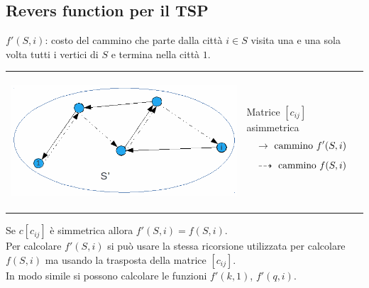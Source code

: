\subsection{Revers function per il TSP}
$f'(S,i)$: costo del cammino che parte dalla città $i\in S$ visita una e una sola volta tutti i vertici di $S$ e termina nella città $1$.
\begin{table}[!h]
	\begin{tabular}{m{11cm} m{5cm}}
		\includegraphics[height=5cm]{images/graph49.png} & 
		Matrice $[c_{ij}]$ asimmetrica
		\begin{equation*}
			\rightarrow\textnormal{ cammino }f'(S,i)
		\end{equation*}
		\begin{equation*}
			\dashrightarrow\textnormal{ cammino }f(S,i)
		\end{equation*}
	\end{tabular}
\end{table}
Se $c[c_{ij}]$ è simmetrica allora $f'(S,i)=f(S,i)$.\\
Per calcolare $f'(S,i)$ si può usare la stessa ricorsione utilizzata per calcolare $f(S,i)$ ma usando la trasposta della matrice $[c_{ij}]$.\\
In modo simile si possono calcolare le funzioni $f'(k,1)$, $f'(q,i)$.

